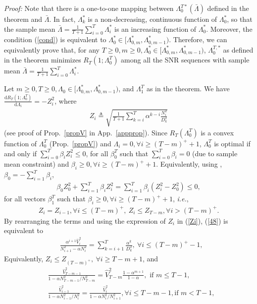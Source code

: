 \documentclass[10pt,twocolumn,twoside]{IEEEtran}
\theoremstyle{plain}
\begin{document}
\noindent\emph{Proof:}
Note that there is a one-to-one mapping between $\Lambda_0^{T*}(\bar\Lambda)$ defined in the theorem
 and $\bar \Lambda$.
 In fact, $\Lambda_k^*$ is a non-decreasing, continuous function of $\Lambda_0^*$, so that the sample mean
 $\bar \Lambda=\frac{1}{T+1}\sum_{i=0}^T \Lambda_i^*$ is an increasing function of $\Lambda_0^*$.
 Moreover, the condition (\ref{cond}) is equivalent to  $\Lambda_0^*\in[\Lambda_{0,m}^*,\Lambda_{0,m-1}^*)$.
 Therefore, we can equivalently prove that, for any $T{\geq}0,m{\geq}0,\Lambda_0^*\in[\Lambda_{0,m}^*,\Lambda_{0,m-1}^*)$,
$\Lambda_0^{T,*}$ as defined in the theorem minimizes $R_T(1;\Lambda_0^T)$ among all the SNR sequences with sample mean 
$\bar \Lambda=\frac{1}{T+1}\sum_{i=0}^T \Lambda_i^*$.


 Let $m\geq 0,T\geq 0,\Lambda_0\in[\Lambda_{0,m}^*,\Lambda_{0,m-1}^*)$,
 and $\Lambda_1^T$ as in the theorem.
We have $\frac{\mathrm dR_T(1;\Lambda_0^T)}{\mathrm d\Lambda_i}=-Z_i^2$,
 where\begin{align}
\label{Zi}
Z_i\triangleq \sqrt{\frac{1}{T+1}\sum_{k=i}^{T}\alpha^{k-i}\frac{N_i^2}{ D_k^2}}
\end{align}
 (see proof of Prop.~\ref{propV} in App.~\ref{appprop}).
Since $R_T(\Lambda_0^T)$ is a convex function of $\Lambda_0^T$ (Prop.~\ref{propV}) and $\Lambda_i=0,\forall i\geq (T-m)^++1$, $\Lambda_0^T$ is optimal  if and only if 
$\sum_{i=0}^{T}\beta_iZ_i^2\leq 0$,
for all $\beta_0^T$ such that $\sum_{i=0}^{T}\beta_i=0$ (due to sample mean constraint)
and $\beta_i\geq 0,\forall i\geq (T-m)^++1$.
Equivalently, using ,$\beta_0=-\sum_{i=1}^{T}\beta_i$,
\begin{align}
\beta_0Z_0^2+\sum_{i=1}^{T}\beta_iZ_i^2=
\sum_{i=1}^{T}\beta_i(Z_i^2-Z_0^2)\leq 0,
\end{align}
for all vectors $\beta_1^T$ such that $\beta_i\geq 0,\forall i\geq (T-m)^++1$, \emph{i.e.},
\begin{align}
\label{48}
\!\!\!\!Z_i=Z_{i-1},\forall i\!\leq\!(T-m)^+,\ Z_i\leq Z_{T-m},\forall i\!>\!(T-m)^+\!\!.\!\!
\end{align}
By rearranging the terms and using the expression of $Z_i$ in (\ref{Zi}), (\ref{48}) is equivalent to
\begin{align}
\label{ddd}
&\frac{\alpha^{i+1}\hat V_i^2}{N_{i+1}^2-\alpha N_i^2}
=
\sum_{k=i+1}^{T}\frac{\alpha^{k}}{ D_k^2},\ \forall i\leq (T-m)^+-1,
\end{align}
Equivalently, $Z_{i}\leq Z_{(T-m)^+},\ \forall i\geq T-m+1$, and
\begin{align}
\label{aaa}
&\!\!\!\frac{\hat V_{T-m-1}^2}{1-\alpha N_{T-m-1}^2/N_{T-m}^2\!\!\!\!\!\!\!\!}
=
\hat V_{T-m}^2\frac{1-\alpha^{m+1}\!\!\!\!}{1-\alpha},\text{ if }m\leq T-1,
\\
\label{bbb}
&\!\!\!\frac{\hat V_{i-1}^2}{\!1\!-\!\alpha N_{i-1}^2/N_{i}^2\!}
\!\!=\!\!
\frac{\hat V_{i}^2}{1\!-\!\alpha N_{i}^2/N_{i+1}^2\!\!\!\!},
\forall i\!\!\leq\!\!T\!-\!m\!-\!1,\text{if }\!m\!<\!T\!-\!1,\!\!\!
\end{align}
\end{document}
